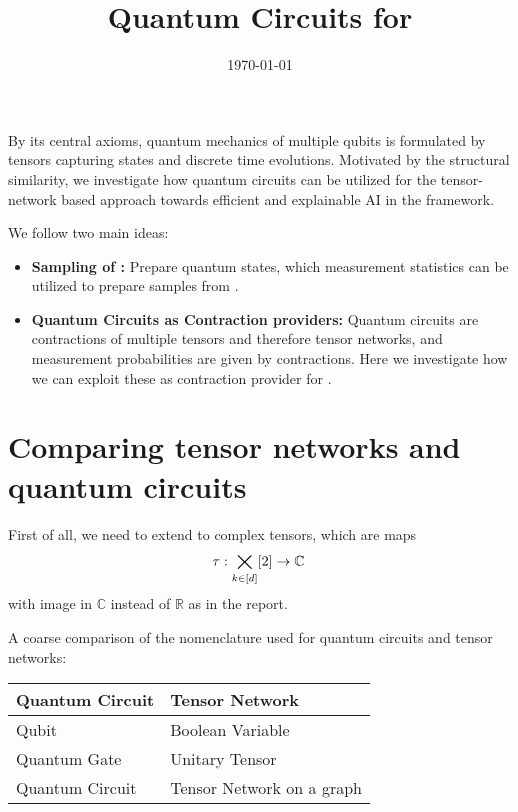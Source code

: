 \documentclass[aps,onecolumn,nofootinbib,pra]{article}
\begin{document}
    \title{Quantum Circuits for \tnreason{}}

    \maketitle
    \date{\today}

    By its central axioms, quantum mechanics of multiple qubits is formulated by tensors capturing states and discrete time evolutions.
    Motivated by the structural similarity, we investigate how quantum circuits can be utilized for the tensor-network based approach towards efficient and explainable AI in the \tnreason{} framework.

    We follow two main ideas:
    \begin{itemize}
        \item \textbf{Sampling of \ComputationActivationNetworks{}:} Prepare quantum states, which measurement statistics can be utilized to prepare samples from \ComputationActivationNetworks{}.
        \item \textbf{Quantum Circuits as Contraction providers:} Quantum circuits are contractions of multiple tensors and therefore tensor networks, and measurement probabilities are given by contractions.
    Here we investigate how we can exploit these as contraction provider for \tnreason{}.
    \end{itemize}




    \section{Comparing tensor networks and quantum circuits}

    First of all, we need to extend to complex tensors, which are maps
    \begin{align*}
        \tau : \bigtimes_{k\in[d]}[2] \rightarrow \mathbb{C} \,
    \end{align*}
    with image in $\mathbb{C}$ instead of $\mathbb{R}$ as in the report.

    A coarse comparison of the nomenclature used for quantum circuits and tensor networks:

    \begin{center}
        \begin{tabular}{l|l}
            \textbf{Quantum Circuit} & \textbf{Tensor Network}   \\
            \hline
            Qubit                    & Boolean Variable          \\
            Quantum Gate             & Unitary Tensor            \\
            Quantum Circuit          & Tensor Network on a graph
        \end{tabular}
    \end{center}
\end{document}

